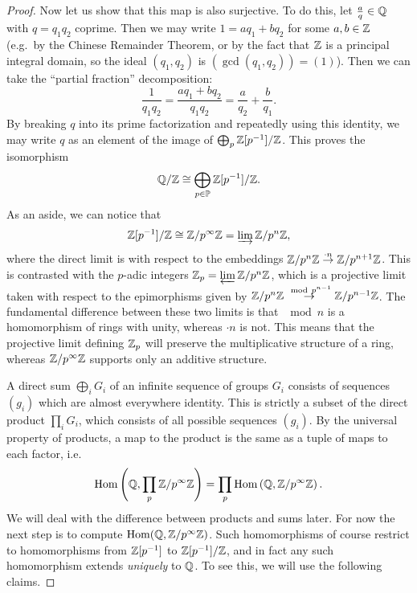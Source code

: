 \begin{proof}
    Now let us show that this map is also surjective. To do this, let $\frac aq\in\mathbb{Q}$ with $q=q_1q_2$ coprime. Then we may write $1=aq_1+bq_2$ for some $a,b\in\mathbb{Z}$ (e.g.~by the Chinese Remainder Theorem, or by the fact that $\mathbb{Z}$ is a principal integral domain, so the ideal $(q_1,q_2)$ is $(\gcd(q_1,q_2))=(1)$). Then we can take the ``partial fraction'' decomposition:
    \[\frac{1}{q_1q_2}=\frac{aq_1+bq_2}{q_1q_2}=\frac{a}{q_2}+\frac{b}{q_1}.\]
    By breaking $q$ into its prime factorization and repeatedly using this identity, we may write $q$ as an element of the image of $\bigoplus_p \mathbb{Z}[p^{-1}]\slash\mathbb{Z}$. This proves the isomorphism 
    \[\mathbb{Q}\slash \mathbb{Z}\cong \bigoplus_{p\in\mathbb{P}}\mathbb{Z}[p^{-1}]\slash\mathbb{Z}.\]
    As an aside, we can notice that 
    \[\mathbb{Z}[p^{-1}]\slash\mathbb{Z}\cong \mathbb{Z}\slash p^\infty\mathbb{Z}=\varinjlim \mathbb{Z}\slash p^n\mathbb{Z},\]
    where the direct limit is with respect to the embeddings $\mathbb{Z}\slash p^n\mathbb{Z}\overset{\cdot n}{\to} \mathbb{Z}\slash p^{n+1}\mathbb{Z}$. This is contrasted with the $p$-adic integers $\mathbb{Z}_p=\varprojlim \mathbb{Z}\slash p^n\mathbb{Z}$, which is a projective limit taken with respect to the epimorphisms given by $\mathbb{Z}\slash p^n\mathbb{Z}\overset{\ \mathrm{mod}\  p^{n-1}}{\to} \mathbb{Z}\slash p^{n-1}\mathbb{Z}$. The fundamental difference between these two limits is that $\mod n$ is a homomorphism of rings with unity, whereas $\cdot n$ is not. This means that the projective limit defining $\mathbb{Z}_p$ will preserve the multiplicative structure of a ring, whereas $\mathbb{Z}\slash p^\infty\mathbb{Z}$ supports only an additive structure.

    A direct sum $\bigoplus_i G_i$ of an infinite sequence of groups $G_i$ consists of sequences $(g_i)$ which are almost everywhere identity. This is strictly a subset of the direct product $\prod_i G_i$, which consists of all possible sequences $(g_i)$. By the universal property of products, a map to the product is the same as a tuple of maps to each factor, i.e.~
    \[\operatorname{Hom}\left(\mathbb{Q},\prod_p \mathbb{Z}\slash p^\infty\mathbb{Z}\right)=\prod_p \operatorname{Hom}\left(\mathbb{Q},\mathbb{Z}\slash p^\infty\mathbb{Z}\right).\]
    We will deal with the difference between products and sums later. For now the next step is to compute $\operatorname{Hom}(\mathbb{Q},\mathbb{Z}\slash p^{\infty}\mathbb{Z})$.  Such homomorphisms of course restrict to homomorphisms from $\mathbb{Z}[p^{-1}]$ to $\mathbb{Z}[p^{-1}]\slash \mathbb{Z}$, and in fact any such homomorphism extends \emph{uniquely} to $\mathbb{Q}$. To see this, we will use the following claims.


\end{proof}

